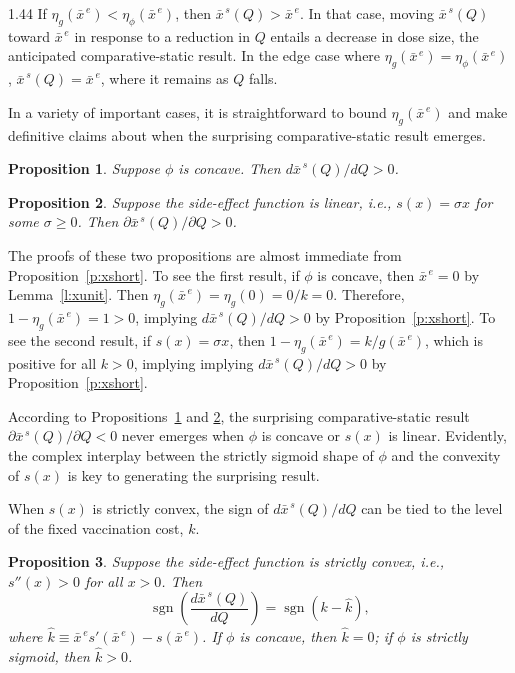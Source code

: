 \documentclass[12pt]{article}
\DeclareMathOperator*{\sgn}{sgn}
\newcommand{\efficacy}{\phi}
\newcommand{\side}{s}
\newcommand{\general}{g}
\newcommand{\xshortbar}{\bar{x}^{\,s}}
\newcommand{\xunitbar}{\bar{x}^{\,e}}
\newcommand{\elasticity}[1]{\eta_{#1}}
\newtheorem{proposition}{Proposition}
\begin{document}
\begin{spacing}{1.44}
If $\elasticity{\general}\!(\xunitbar) <
\elasticity{\efficacy}\!(\xunitbar)$, then $\xshortbar\!(Q) >
\xunitbar$. In that case, moving $\xshortbar\!(Q)$ toward $\xunitbar$
in response to a reduction in $Q$ entails a decrease in dose size, the
anticipated comparative-static result. In the edge case where
$\elasticity{\general}\!(\xunitbar) =
\elasticity{\efficacy}\!(\xunitbar)$, $\xshortbar\!(Q) = \xunitbar$,
where it remains as $Q$ falls.

In a variety of important cases, it is straightforward to bound
$\elasticity{\general}\!(\xunitbar)$ and make definitive claims about
when the surprising comparative-static result emerges.
\begin{proposition}
\label{p:concave}
\singlespace
Suppose $\efficacy$ is concave. Then $d \xshortbar\!(Q) /
d Q > 0$.
\end{proposition}

\begin{proposition}
\label{p:linear}
\singlespace
Suppose the side-effect function is linear, i.e., $\side(x) = \sigma
x$ for some $\sigma \geq 0$. Then $\partial \xshortbar\!(Q) / \partial
Q > 0$.
\end{proposition}

\noindent The proofs of these two propositions are almost immediate
from Proposition~\ref{p:xshort}. To see the first result, if
$\efficacy$ is concave, then $\xunitbar = 0$ by
Lemma~\ref{l:xunit}. Then $\elasticity{\general}\!(\xunitbar) =
\elasticity{\general}\!(0) = 0 / k = 0$. Therefore, $1 -
\elasticity{\general}\!(\xunitbar) = 1 > 0$, implying $d
\xshortbar\!(Q) / d Q > 0$ by Proposition~\ref{p:xshort}. To see the
second result, if $\side(x) = \sigma x$, then $1 -
\elasticity{\general}\!(\xunitbar) = k / \general(\xunitbar)$, which
is positive for all $k > 0$, implying implying $d \xshortbar\!(Q) / d
Q > 0$ by Proposition~\ref{p:xshort}.

According to Propositions~\ref{p:concave} and \ref{p:linear}, the
surprising comparative-static result $\partial \xshortbar\!(Q) /
\partial Q < 0$ never emerges when $\efficacy$ is concave or
$\side(x)$ is linear. Evidently, the complex interplay between the
strictly sigmoid shape of $\efficacy$ and the convexity of $\side(x)$
is key to generating the surprising result.

When $\side(x)$ is strictly convex, the sign of $d
\xshortbar\!(Q) / d Q$ can be tied to the level of the fixed
vaccination cost, $k$.
\begin{proposition}
\label{p:k}
\singlespace
Suppose the side-effect function is strictly convex, i.e., $\side''(x)
> 0$ for all $x > 0$. Then
\begin{equation}
\label{sign_k}
\sgn \left( \frac{d \xshortbar\!(Q)}{d Q} \right) = \sgn
(k - \hat{k}),
\end{equation}
where $\hat{k} \equiv \xunitbar \side'(\xunitbar) -
\side(\xunitbar)$. If $\efficacy$ is concave, then $\hat{k} = 0$; if
$\efficacy$ is strictly sigmoid, then $\hat{k} > 0$.
\end{proposition}


\end{spacing}
\end{document}
